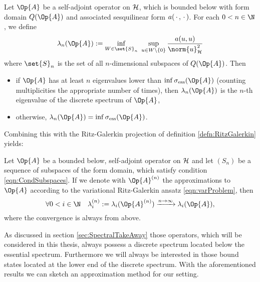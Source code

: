 \begin{thm}
	\label{thm:CourantFischer}
	Let $\Op{A}$ be a self-adjoint operator on $\mathcal{H}$,
	which is bounded below with form domain $Q(\Op{A})$
	and associated sesquilinear form $a(\,\cdot\,,\,\cdot\,)$.
	For each $0 < n \in \N$, we define
	\begin{equation}
		\lambda_n(\Op{A}) := \inf_{W \in \set{S}_n} \ \sup_{u \in W \backslash \{0\}}
		\frac{a(u,u)}{\norm{u}_\hilbert^2}
		\label{eqn:CourantFischer}
	\end{equation}
	where $\set{S}_n$ is the set of all $n$-dimensional subspaces of $Q(\Op{A})$.
	Then
	\begin{itemize}
		\item if $\Op{A}$ has at least $n$ eigenvalues lower
			than $\inf \sigma_\text{ess}(\Op{A})$ (counting multiplicities
			the appropriate number of times),
			then $\lambda_n(\Op{A})$ is the $n$-th eigenvalue of the discrete spectrum
			of $\Op{A}$,
		\item otherwise, $\lambda_n(\Op{A}) = \inf \sigma_\text{ess}(\Op{A})$.
	\end{itemize}
\end{thm}

\noindent
Combining this with the Ritz-Galerkin projection of definition \ref{defn:RitzGalerkin}
yields:

\begin{cor}
	\label{cor:Convergence}
	Let $\Op{A}$ be a bounded below, self-adjoint operator on $\mathcal{H}$
	and let $(S_n)$ be a sequence of subspaces of the form domain,
	which satisfy condition \eqref{eqn:CondSubspaces}.
	If we denote with $\Op{A}^{(n)}$
	the approximations to $\Op{A}$
	according to the variational Ritz-Galerkin ansatz
	\eqref{eqn:varProblem}, then
	\[ \forall 0 < i \in \N \quad \lambda^{(n)}_i := \lambda_i(\Op{A}^{(n)}) \xrightarrow{n\to\infty} \lambda_i(\Op{A}), \]
	where the convergence is always from above.
\end{cor}

As discussed in section \vref{sec:SpectralTakeAway}
those operators,
which will be considered in this thesis,
always possess a discrete spectrum located below the essential spectrum.
Furthermore we will always be interested
in those bound states located at the lower end of the discrete spectrum.
With the aforementioned results we can
sketch an approximation method for our setting.

